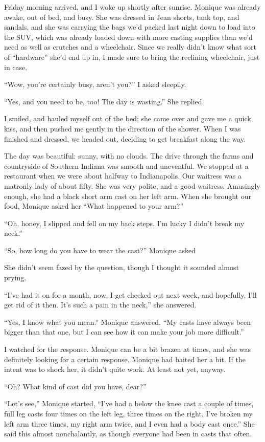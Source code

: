 Friday morning arrived, and I woke up shortly after sunrise. Monique was already awake, out
of bed, and busy. She was dressed in Jean shorts, tank top, and sandals, and she was carrying
the bags we'd packed last night down to load into the SUV, which was already loaded down with
more casting supplies than we'd need as well as crutches and a wheelchair. Since we really
didn't know what sort of ``hardware'' she'd end up in, I made sure to bring the reclining
wheelchair, just in case.

``Wow, you're certainly busy, aren't you?'' I asked sleepily.

``Yes, and you need to be, too! The day is wasting.'' She replied.

I smiled, and hauled myself out of the bed; she came over and gave me a quick kiss, and
then pushed me gently in the direction of the shower. When I was finished and dressed, we headed
out, deciding to get breakfast along the way.

The day was beautiful: sunny, with no clouds. The drive through the farms and countryside
of Southern Indiana was smooth and uneventful. We stopped at a restaurant when we were about
halfway to Indianapolis. Our waitress was a matronly lady of about fifty. She was very polite,
and a good waitress. Amusingly enough, she had a black short arm cast on her left arm. When she
brought our food, Monique asked her ``What happened to your arm?''

``Oh, honey, I slipped and fell on my back steps. I'm lucky I didn't break my neck.''

``So, how long do you have to wear the cast?'' Monique asked

She didn't seem fazed by the question, though I thought it sounded almost prying.

``I've had it on for a month, now. I get checked out next week, and hopefully, I'll get rid
of it then. It's such a pain in the neck,'' she answered.

``Yes, I know what you mean.'' Monique answered. ``My casts have always been bigger than that
one, but I can see how it can make your job more difficult.''

I watched for the response. Monique can be a bit brazen at times, and she was definitely
looking for a certain response. Monique had baited her a bit. If the intent was to shock her, it
didn't quite work. At least not yet, anyway.

``Oh? What kind of cast did you have, dear?''

``Let's see,'' Monique started, ``I've had a below the knee cast a couple of times, full leg
casts four times on the left leg, three times on the right, I've broken my left arm three times,
my right arm twice, and I even had a body cast once.'' She said this almost nonchalantly, as
though everyone had been in casts that often.

